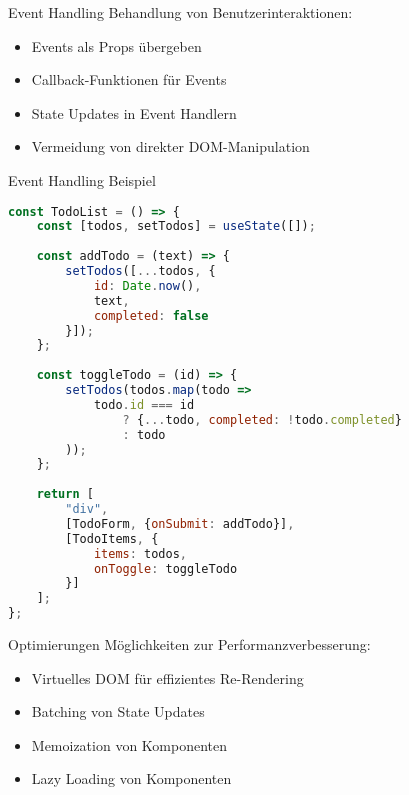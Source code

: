 \begin{concept}{Event Handling}
    Behandlung von Benutzerinteraktionen:
    \begin{itemize}
        \item Events als Props übergeben
        \item Callback-Funktionen für Events
        \item State Updates in Event Handlern
        \item Vermeidung von direkter DOM-Manipulation
    \end{itemize}
\end{concept}

\begin{KR}{Event Handling Beispiel}
\begin{lstlisting}[language=JavaScript, style=basesmol]
const TodoList = () => {
    const [todos, setTodos] = useState([]);
    
    const addTodo = (text) => {
        setTodos([...todos, {
            id: Date.now(),
            text,
            completed: false
        }]);
    };
    
    const toggleTodo = (id) => {
        setTodos(todos.map(todo =>
            todo.id === id
                ? {...todo, completed: !todo.completed}
                : todo
        ));
    };
    
    return [
        "div",
        [TodoForm, {onSubmit: addTodo}],
        [TodoItems, {
            items: todos,
            onToggle: toggleTodo
        }]
    ];
};
\end{lstlisting}
\end{KR}

\begin{corollary}{Optimierungen}
    Möglichkeiten zur Performanzverbesserung:
    \begin{itemize}
        \item Virtuelles DOM für effizientes Re-Rendering
        \item Batching von State Updates
        \item Memoization von Komponenten
        \item Lazy Loading von Komponenten
    \end{itemize}
\end{corollary}
